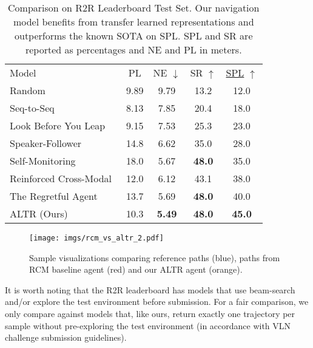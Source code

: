 \documentclass[10pt,twocolumn,letterpaper]{article}
\begin{document}
\begin{table}
\setlength\tabcolsep{3.9pt}
    \centering
    \begin{tabular}{lcccc}\\[0.3em]
    Model                               & PL    & NE $\downarrow$ & SR $\uparrow$ & \underline{SPL} $\uparrow$ \\\Xhline{2\arrayrulewidth}   
    Random~\cite{Anderson:2018:VLN}      & 9.89  & 9.79           & 13.2         & 12.0  \\
    Seq-to-Seq~\cite{Anderson:2018:VLN}  & 8.13  & 7.85           & 20.4         & 18.0  \\
    \hline
    Look Before You Leap~\cite{Wang2018Look} & 9.15 & 7.53        & 25.3         & 23.0  \\
    Speaker-Follower~\cite{Fried:2018:Speaker} & 14.8 & 6.62      & 35.0         & 28.0  \\
    Self-Monitoring~\cite{Ma:2019:SelfMonitoringAgent} & 18.0 & 5.67 & \textbf{48.0}      & 35.0 \\
    Reinforced Cross-Modal~\cite{Wang:2018:RCM} & 12.0 & 6.12     & 43.1         & 38.0  \\
    The Regretful Agent~\cite{ma2019regretful} & 13.7 & 5.69 & \textbf{48.0} & 40.0 \\
    \hline
    ALTR (Ours)                                & 10.3  & \textbf{5.49}          & \textbf{48.0}        & \textbf{45.0}  \\
    \end{tabular}
    \caption{Comparison on R2R Leaderboard Test Set. Our navigation model benefits from transfer learned representations and outperforms the known SOTA on SPL. SPL and SR are reported as percentages and NE and PL in meters.}
    \label{tab:test_submission}
\end{table}


\begin{figure}
  \centering   
  \texttt{[image: imgs/rcm\_vs\_altr\_2.pdf]}

\caption{ 
    Sample visualizations comparing reference paths (blue), paths from RCM baseline agent (red) and our ALTR agent (orange).}
    \label{fig:sample_viz}
\end{figure}

It is worth noting that the R2R leaderboard has models that use beam-search and/or explore the test environment before submission. For a fair comparison, we only compare against models that, like ours, return exactly one trajectory per sample without pre-exploring the test environment (in accordance with VLN challenge submission guidelines).
\end{document}
